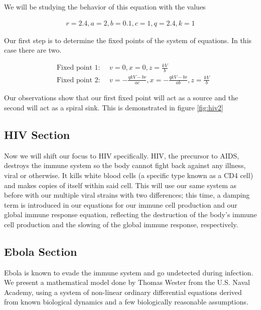 \documentclass{article}
\begin{document}
We will be studying the behavior of this equation with the values

\begin{equation}
    \begin{split}
        r = 2.4, a = 2, b=0.1,c=1,q=2.4,k=1
    \end{split}
    \label{eq:vals}
\end{equation}

Our first step is to determine the fixed points of the system of equations. In this case there are two.

\begin{equation}
	\begin{split}
		&\text{Fixed point 1: } \quad v=0,x=0,z={\frac {kV}{b}} \\
		&\text{Fixed point 2: } \quad v=-{\frac {qkV-br}{ac}},x=-{\frac {qkV-br}{ab}},z={\frac {kV}{b}} 
	\end{split}
	\label{eq:fixed}
\end{equation}

Our observations show that our first fixed point will act as a source and the second will act as a spiral sink. This is demonstrated in figure \ref{fig:hiv2}





\subsection{HIV Section}
Now we will shift our focus to HIV specifically. HIV, the precursor to AIDS, destroys the immune system so the body cannot fight back against any illness, viral or otherwise. It kills white blood cells (a specific type known as a CD4 cell) and makes copies of itself within said cell. This will use our same system as before with our multiple viral strains with two differences; this time, a damping term is introduced in our equations for our immune cell production and our global immune response equation, reflecting the destruction of the body’s immune cell production and the slowing of the global immune response, respectively.

\subsection{Ebola Section}
Ebola is known to evade the immune system and go undetected during infection. We present a mathematical model done by Thomas Wester from the U.S. Naval Academy, using a system of non-linear ordinary differential equations derived from known biological dynamics and a few biologically reasonable assumptions.
\end{document}
